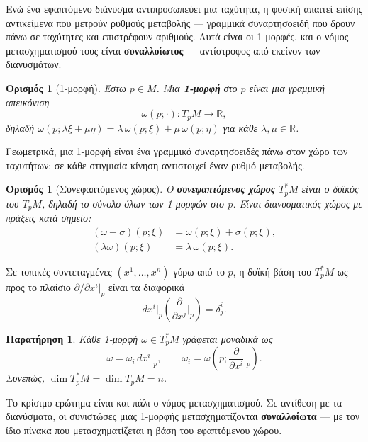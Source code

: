 \documentclass[11pt,a4paper,twoside,openright]{book}
\newtheorem{remark}[lemma]{Παρατήρηση}
\newtheorem{definition}[lemma]{Ορισμός}
\begin{document}
Ενώ ένα εφαπτόμενο διάνυσμα αντιπροσωπεύει μια ταχύτητα, η φυσική απαιτεί επίσης αντικείμενα που μετρούν ρυθμούς μεταβολής --- γραμμικά συναρτησοειδή που δρουν πάνω σε ταχύτητες και επιστρέφουν αριθμούς. Αυτά είναι οι 1-μορφές, και ο νόμος μετασχηματισμού τους είναι \textbf{συναλλοίωτος} --- αντίστροφος από εκείνον των διανυσμάτων.

\begin{definition}[1-μορφή]
Έστω $p \in M$. Μια \textbf{1-μορφή} στο $p$ είναι μια γραμμική απεικόνιση
\begin{equation}
\omega(p; \cdot): T_pM \to \mathbb{R},
\end{equation}
δηλαδή $\omega(p; \lambda \xi + \mu \eta) = \lambda \, \omega(p; \xi) + \mu \, \omega(p; \eta)$ για κάθε $\lambda, \mu \in \mathbb{R}$.
\end{definition}

Γεωμετρικά, μια 1-μορφή είναι ένα γραμμικό συναρτησοειδές πάνω στον χώρο των ταχυτήτων: σε κάθε στιγμιαία κίνηση αντιστοιχεί έναν ρυθμό μεταβολής.

\begin{definition}[Συνεφαπτόμενος χώρος]
Ο \textbf{συνεφαπτόμενος χώρος} $T_p^*M$ είναι ο δυϊκός του $T_pM$, δηλαδή το σύνολο όλων των 1-μορφών στο $p$. Είναι διανυσματικός χώρος με πράξεις κατά σημείο:
\begin{align}
(\omega + \sigma)(p; \xi) &= \omega(p; \xi) + \sigma(p; \xi), \\
(\lambda \omega)(p; \xi) &= \lambda \, \omega(p; \xi).
\end{align}
\end{definition}

Σε τοπικές συντεταγμένες $(x^1, \dots, x^n)$ γύρω από το $p$, η δυϊκή βάση του $T_p^*M$ ως προς το πλαίσιο $\partial / \partial x^i|_p$ είναι τα διαφορικά
\begin{equation}
dx^i|_p \left( \frac{\partial}{\partial x^j}\bigg|_p \right) = \delta^i_j.
\end{equation}

\begin{remark}
Κάθε 1-μορφή $\omega \in T_p^*M$ γράφεται μοναδικά ως
\[
\omega = \omega_i \, dx^i|_p, \qquad \omega_i = \omega\left(p; \frac{\partial}{\partial x^i}\bigg|_p\right).
\]
Συνεπώς, $\dim T_p^*M = \dim T_pM = n$.
\end{remark}

Το κρίσιμο ερώτημα είναι και πάλι ο νόμος μετασχηματισμού. Σε αντίθεση με τα διανύσματα, οι συνιστώσες μιας 1-μορφής μετασχηματίζονται \textbf{συναλλοίωτα} --- με τον ίδιο πίνακα που μετασχηματίζεται η βάση του εφαπτόμενου χώρου.
\end{document}
